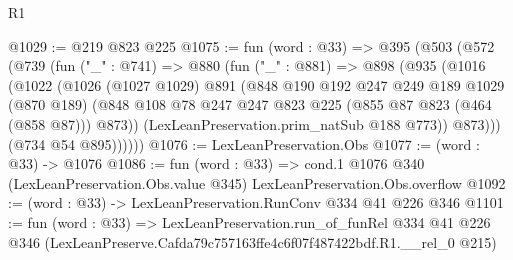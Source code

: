 \begin{lexlean}{R1}
\begin{coremodule}
@1029 := @219 @823 @225
@1075 := fun (word : @33) =>
  @395
    (@503
      (@572
        (@739
          (fun ("_" : @741) =>
          @880
            (fun ("_" : @881) =>
            @898
              (@935
                (@1016
                  (@1022
                    (@1026
                      (@1027 @1029)
                      @891
                      (@848
                        @190
                        @192
                        @247
                        @249
                        @189
                        @1029
                        (@870 @189)
                        (@848 @108 @78 @247 @247 @823 @225 (@855 @87 @823 (@464 (@858 @87))) @873))
                      (LexLeanPreservation.prim_natSub @188 @773))
                    @873)))
              (@734 @54 @895))))))
@1076 := LexLeanPreservation.Obs
@1077 := (word : @33) -> @1076
@1086 := fun (word : @33) =>
  cond.{1} @1076 @340 (LexLeanPreservation.Obs.value @345) LexLeanPreservation.Obs.overflow
@1092 := (word : @33) -> LexLeanPreservation.RunConv @334 @41 @226 @346
@1101 := fun (word : @33) =>
  LexLeanPreservation.run_of_funRel
    @334
    @41
    @226
    @346
    (LexLeanPreserve.Cafda79c757163ffe4c6f07f487422bdf.R1.__rel_0 @215)
\end{coremodule}
\end{lexlean}

